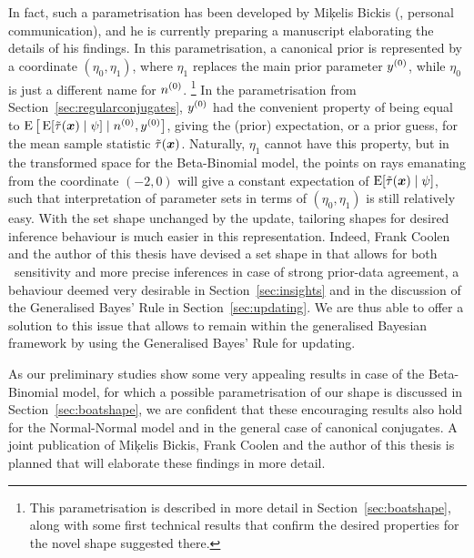 In fact, such a parametrisation has been developed by Mi\c{k}elis Bickis (\cite*{2011:bickis:geomip}, personal communication),
and he is currently preparing a manuscript elaborating the details of his findings.
In this parametrisation, a canonical prior is represented by a coordinate $(\eta_0,\eta_1)$,
where $\eta_1$ replaces the main prior parameter $y^{(0)}$,
while $\eta_0$ is just a different name for $n^{(0)}$.%
\footnote{This parametrisation is described in more detail in Section~\ref{sec:boatshape},
along with some first technical results that confirm the desired properties for the novel shape suggested there.}
In the parametrisation from Section~\ref{sec:regularconjugates},
$y^{(0)}$ had the convenient property of being equal to $\operatorname{E}\big[\operatorname{E}[\tilde{\tau}({\bm x}) \mid \psi] \mid n^{(0)}, y^{(0)}\big]$,
giving the (prior) expectation, or a prior guess, for the mean sample statistic $\tilde{\tau}({\bm x})$.
Naturally, $\eta_1$ cannot have this property,
but in the transformed space for the Beta-Binomial model, the points on rays emanating from the coordinate $(-2,0)$
will give a constant expectation of $\operatorname{E}[\tilde{\tau}({\bm x}) \mid \psi]$,
such that interpretation of parameter sets in terms of $(\eta_0,\eta_1)$ is still relatively easy.
With the set shape unchanged by the update, 
tailoring shapes for desired inference behaviour is much easier in this representation.
Indeed, Frank Coolen and the author of this thesis have devised
a set shape in %
that allows for both \pdc\ sensitivity
and more precise inferences in case of strong prior-data agreement,
a behaviour deemed very desirable in Section~\ref{sec:insights}
and in the discussion of the Generalised Bayes' Rule in Section~\ref{sec:updating}.
We are thus able to offer a solution to this issue that allows to remain within the generalised Bayesian framework
by using the Generalised Bayes' Rule for updating.

As our preliminary studies show some very appealing results in case of the Beta-Binomial model,
for which a possible parametrisation of our shape is discussed in Section~\ref{sec:boatshape},
we are confident that these encouraging results also hold for the Normal-Normal model
and in the general case of canonical conjugates.
A joint publication of Mi\c{k}elis Bickis, Frank Coolen and the author of this thesis is planned
that will elaborate these findings in more detail.

